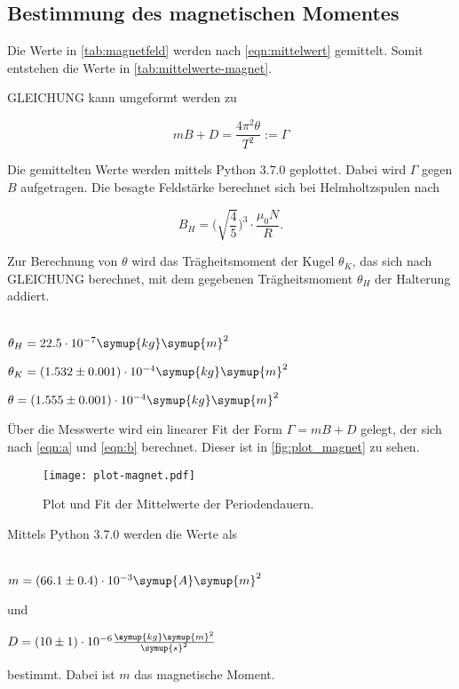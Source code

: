 \subsection{Bestimmung des magnetischen Momentes}



Die Werte in \autoref{tab:magnetfeld} werden nach \eqref{eqn:mittelwert} gemittelt. Somit entstehen die Werte in \autoref{tab:mittelwerte-magnet}.



GLEICHUNG kann umgeformt werden zu

\begin{equation}
  mB + D = \frac{4 \pi^2 \theta}{T^2} := \Gamma
\end{equation}

Die gemittelten Werte werden mittels Python 3.7.0 geplottet. Dabei wird $\Gamma$ gegen $B$ aufgetragen. Die besagte Feldstärke berechnet sich bei Helmholtzspulen nach

\begin{equation}
    B_H = \bigg( \sqrt{\frac{4}{5}} \bigg)^3 \cdot \frac{\mu_0 N}{R}.
\end{equation}

Zur Berechnung von $\theta$ wird das Trägheitsmoment der Kugel $\theta_K$, das sich nach GLEICHUNG berechnet, mit dem gegebenen Trägheitsmoment $\theta_H$ der Halterung addiert.
\\ \\
\centerline{$\theta_H = 22.5 \cdot 10^{-7} \symup{kg} \symup{m}^2$}

\centerline{$\theta_K = (1.532 \pm 0.001) \cdot 10^{-4} \symup{kg} \symup{m}^2$}

\centerline{$\theta = (1.555 \pm 0.001) \cdot 10^{-4} \symup{kg} \symup{m}^2$}

Über die Messwerte wird ein linearer Fit der Form $\Gamma = mB + D$ gelegt, der sich nach \eqref{eqn:a} und \eqref{eqn:b} berechnet.
Dieser ist in \autoref{fig:plot_magnet} zu sehen.

\begin{figure}
  \centering
  \texttt{[image: plot-magnet.pdf]}
  \caption{Plot und Fit der Mittelwerte der Periodendauern.}
  \label{fig:plot_magnet}
\end{figure}

Mittels Python 3.7.0 werden die Werte als
\\ \\
\centerline{$m = (66.1 \pm 0.4) \cdot 10^{-3} \symup{A}\symup{m}^2$}

und

\centerline{$D = (10 \pm 1) \cdot 10^{-6} \frac{\symup{kg} \symup{m}^2}{\symup{s}^2}$}

bestimmt.
Dabei ist $m$ das magnetische Moment.